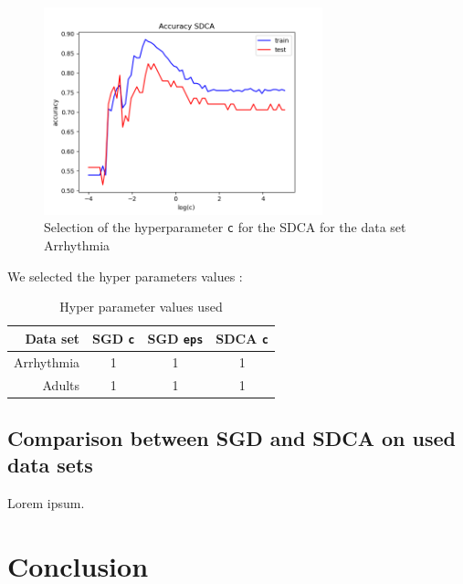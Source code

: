 \documentclass{article}
\begin{document}
\begin{figure}[H]
	\centering
	\includegraphics[height=6cm]{figs/hyperparams/SDCA_c.png}
	\caption{Selection of the hyperparameter \texttt{c} for the SDCA for the data set Arrhythmia}
\end{figure}

We selected the hyper parameters values :

\begin{table}[H]
	\centering
	\begin{tabular}{rccc}
		\toprule
		Data set & SGD \texttt{c} & SGD \texttt{eps} & SDCA \texttt{c}\\
		\midrule
		Arrhythmia & 1 & 1 & 1\\
		Adults & 1 & 1 & 1\\
		\bottomrule
	\end{tabular}
	\caption{Hyper parameter values used}
\end{table}

\subsection{Comparison between SGD and SDCA on used data sets}

Lorem ipsum.


\section*{Conclusion}




\end{document}
